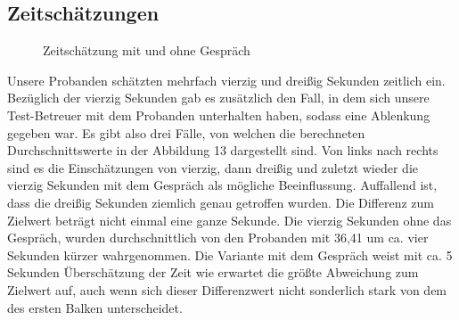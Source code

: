 \documentclass{Paper}
\begin{document}
\subsection{Zeitschätzungen}
\begin{figure}
\caption{Zeitschätzung mit und ohne Gespräch}
\label{ZeitGespr}
\end{figure}
\par
Unsere Probanden schätzten mehrfach vierzig und dreißig Sekunden zeitlich ein. Bezüglich der vierzig Sekunden gab es zusätzlich den Fall, in dem sich unsere Test-Betreuer mit dem Probanden unterhalten haben, sodass eine Ablenkung gegeben war. Es gibt also drei Fälle, von welchen die berechneten Durchschnittswerte in der Abbildung 13 dargestellt sind. Von links nach rechts sind es die Einschätzungen von vierzig, dann dreißig und zuletzt wieder die vierzig Sekunden mit dem Gespräch als mögliche Beeinflussung. Auffallend ist, dass die dreißig Sekunden ziemlich genau getroffen wurden. Die Differenz zum Zielwert beträgt nicht einmal eine ganze Sekunde. Die vierzig Sekunden ohne das Gespräch, wurden durchschnittlich von den Probanden mit 36,41 um ca. vier Sekunden kürzer wahrgenommen. Die Variante mit dem Gespräch weist mit ca. 5 Sekunden Überschätzung der Zeit wie erwartet die größte Abweichung zum Zielwert auf, auch wenn sich dieser Differenzwert nicht sonderlich stark von dem des ersten Balken unterscheidet.
\end{document}
